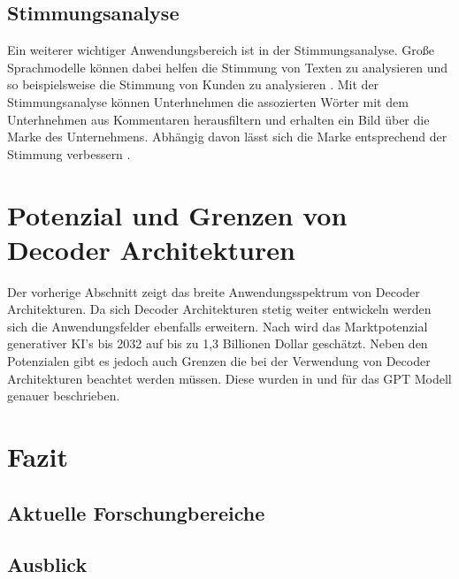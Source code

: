 \documentclass[conference]{IEEEtran}
\begin{document}
\subsection{Stimmungsanalyse}
Ein weiterer wichtiger Anwendungsbereich ist in der Stimmungsanalyse. Große Sprachmodelle können dabei helfen die Stimmung von Texten zu analysieren und so beispielsweise die Stimmung von Kunden zu analysieren \cite{keary12PraktischeLarge2023}. Mit der Stimmungsanalyse können Unterhnehmen die assozierten Wörter mit dem Unterhnehmen aus Kommentaren herausfiltern und erhalten ein Bild über die Marke des Unternehmens. Abhängig davon lässt sich die Marke entsprechend der Stimmung verbessern \cite{keary12PraktischeLarge2023}.

\section{Potenzial und Grenzen von Decoder Architekturen}
Der vorherige Abschnitt zeigt das breite Anwendungsspektrum von Decoder Architekturen. Da sich Decoder Architekturen stetig weiter entwickeln werden sich die Anwendungsfelder ebenfalls erweitern. Nach \cite{keary12PraktischeLarge2023} wird das Marktpotenzial generativer KI's bis 2032 auf bis zu 1,3 Billionen Dollar geschätzt. Neben den Potenzialen gibt es jedoch auch Grenzen die bei der Verwendung von Decoder Architekturen beachtet werden müssen. Diese wurden in \cite{radfordLanguageModelsAre} und \cite{openaiGPT4TechnicalReport2024} für das GPT Modell genauer beschrieben.


\section{Fazit}
\subsection{Aktuelle Forschungbereiche}
\subsection{Ausblick}






\end{document}
